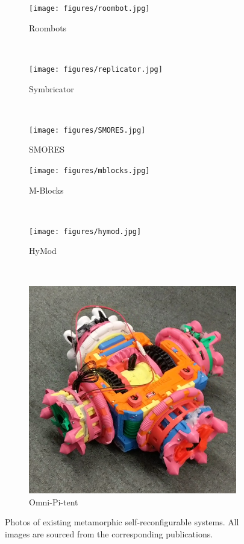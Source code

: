 \begin{figure}[!t]
    \begin{subfigure}[b]{0.315\textwidth}
        \centering
        \texttt{[image: figures/roombot.jpg]}
        \caption{Roombots}
    \end{subfigure}
    ~
    \begin{subfigure}[b]{0.315\textwidth}
        \centering
        \texttt{[image: figures/replicator.jpg]}
        \caption{Symbricator}
    \end{subfigure}
    ~
    \begin{subfigure}[b]{0.315\textwidth}
        \centering
        \texttt{[image: figures/SMORES.jpg]}
        \caption{SMORES}
    \end{subfigure}

    \begin{subfigure}[b]{0.315\textwidth}
        \centering
        \texttt{[image: figures/mblocks.jpg]}
        \caption{M-Blocks}
    \end{subfigure}
    ~
    \begin{subfigure}[b]{0.315\textwidth}
        \centering
        \texttt{[image: figures/hymod.jpg]}
        \caption{HyMod}
    \end{subfigure}
    ~
    \begin{subfigure}[b]{0.315\textwidth}
        \centering
        \includegraphics[width=\textwidth,height=\textwidth,keepaspectratio]{figures/omnipitent.png}
        \caption{Omni-Pi-tent}
    \end{subfigure}


    \caption{Photos of existing metamorphic self-reconfigurable systems. All
    images are sourced from the corresponding publications.}
    \label{fig:robots}
\end{figure}



